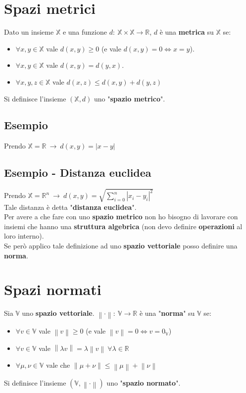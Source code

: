 \documentclass[a4paper, oneside]{article}
\newcommand\X{\mathbb{X}}
\newcommand\R{\mathbb{R}}
\newcommand\norma{\left\lVert\cdot\right\rVert}
\newcommand\V{\mathbb{V}}
\begin{document}
\newpage

\section{Spazi metrici}
Dato un insieme $\X$ e una funzione $d: \ \X\times\X\to\R$, $d$ è una \textbf{metrica} su $\X$ se:
\begin{itemize}
    \item $\forall x,y\in\X$ vale $d(x,y) \geq 0$ (e vale $d(x,y) = 0 \Longleftrightarrow x=y$).
    \item $\forall x,y\in\X$ vale $d(x,y)=d(y,x)$.
    \item $\forall x,y,z\in\X$ vale $d(x,z) \leq d(x,y) + d(y,z)$
\end{itemize}
Si definisce l'insieme $(\X,d)$ uno "\textbf{spazio metrico}".

\subsection{Esempio}
Prendo $\X=\R \ \rightarrow \ d(x,y) = |x-y|$

\subsection{Esempio - Distanza euclidea}
Prendo $\displaystyle \X=\R^n \ \rightarrow \ d(x,y) = \sqrt{\sum_{i=0}^{n} |x_i-y_i|^2}$\\
Tale distanza è detta "\textbf{distanza euclidea}".\\

\noindent Per avere a che fare con uno \textbf{spazio metrico} non ho bisogno di lavorare con insiemi che hanno una
\textbf{struttura algebrica} (non devo definire \textbf{operazioni} al loro interno).\\
Se però applico tale definizione ad uno \textbf{spazio vettoriale} posso definire una \textbf{norma}. 

\newpage

\section{Spazi normati}
Sia $\V$ uno \textbf{spazio vettoriale}. $\norma: \ \V\to\R$ è una "\textbf{norma}" su $\V$ se:
\begin{itemize}
    \item $\forall v\in\V$ vale $\left\lVert v\right\rVert \geq 0$ (e vale $\left\lVert v\right\rVert =0 \Longleftrightarrow v=0_\V$)
    \item $\forall v\in\V$ vale $\left\lVert \lambda v\right\rVert = \lambda \left\lVert v\right\rVert  \ \forall \lambda\in\R$
    \item $\forall\mu,\nu\in\V$ vale che $\left\lVert \mu+\nu\right\rVert \leq \left\lVert \mu\right\rVert + \left\lVert \nu\right\rVert $
\end{itemize}
Si definisce l'insieme $(\V,\norma)$ uno "\textbf{spazio normato}".
\end{document}
